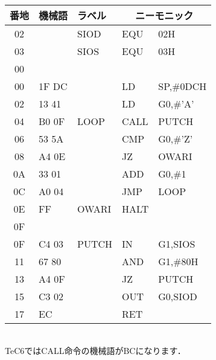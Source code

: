 \begin{center}
{{\begin{description}
\begin{center}
{\footnotesize\tt
\begin{tabular}{|c|l|l|l l|} \hline
番地 & 機械語 & ラベル & \multicolumn{2}{|c|}{ニーモニック} \\
\hline
02 &       & SIOD  & EQU  & 02H             \\
03 &       & SIOS  & EQU  & 03H             \\
00 &       &       &      &                 \\
00 & 1F DC &       & LD   & SP,\#0DCH       \\
02 & 13 41 &       & LD   & G0,\#'A'        \\
04 & B0 0F & LOOP  & CALL & PUTCH           \\
06 & 53 5A &       & CMP  & G0,\#'Z'        \\
08 & A4 0E &       & JZ   & OWARI           \\
0A & 33 01 &       & ADD  & G0,\#1          \\
0C & A0 04 &       & JMP  & LOOP            \\
0E & FF    & OWARI & HALT &                 \\
0F &       &       &      &                 \\
0F & C4 03 & PUTCH & IN   & G1,SIOS         \\
11 & 67 80 &       & AND  & G1,\#80H        \\
13 & A4 0F &       & JZ   & PUTCH           \\
15 & C3 02 &       & OUT  & G0,SIOD         \\
17 & EC    &       & RET  &                 \\
\hline
\end{tabular}
\\TeC6ではCALL命令の機械語がBCになります．
}
\end{center}
\end{description}
}}
\end{center}

